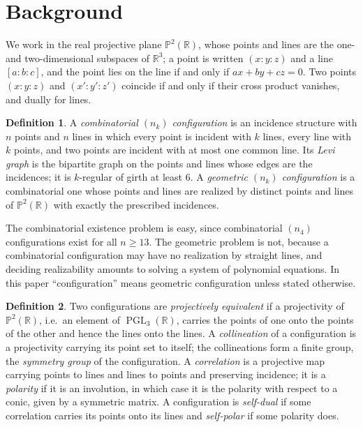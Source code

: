 \documentclass[11pt]{article}
\theoremstyle{plain}
\theoremstyle{definition}
\newtheorem*{definition}{Definition}
\newcommand{\RR}{\mathbb{R}}
\newcommand{\PP}{\mathbb{P}}
\newcommand{\PGL}{\operatorname{PGL}}
\begin{document}
\section{Background}\label{sec:background}

We work in the real projective plane $\PP^2(\RR)$, whose points and lines are the one- and two-dimensional subspaces of $\RR^3$; a point is written $(x{:}y{:}z)$ and a line $[a{:}b{:}c]$, and the point lies on the line if and only if $ax+by+cz=0$.  Two points $(x{:}y{:}z)$ and $(x'{:}y'{:}z')$ coincide if and only if their cross product vanishes, and dually for lines.

\begin{definition}
A \emph{combinatorial $(n_k)$ configuration} is an incidence structure with $n$ points and $n$ lines in which every point is incident with $k$ lines, every line with $k$ points, and two points are incident with at most one common line.  Its \emph{Levi graph} is the bipartite graph on the points and lines whose edges are the incidences; it is $k$-regular of girth at least $6$.  A \emph{geometric $(n_k)$ configuration} is a combinatorial one whose points and lines are realized by distinct points and lines of $\PP^2(\RR)$ with exactly the prescribed incidences.
\end{definition}

The combinatorial existence problem is easy, since combinatorial $(n_4)$ configurations exist for all $n\ge13$.  The geometric problem is not, because a combinatorial configuration may have no realization by straight lines, and deciding realizability amounts to solving a system of polynomial equations.  In this paper ``configuration'' means geometric configuration unless stated otherwise.

\begin{definition}
Two configurations are \emph{projectively equivalent} if a projectivity of $\PP^2(\RR)$, i.e.\ an element of $\PGL_3(\RR)$, carries the points of one onto the points of the other and hence the lines onto the lines.  A \emph{collineation} of a configuration is a projectivity carrying its point set to itself; the collineations form a finite group, the \emph{symmetry group} of the configuration.  A \emph{correlation} is a projective map carrying points to lines and lines to points and preserving incidence; it is a \emph{polarity} if it is an involution, in which case it is the polarity with respect to a conic, given by a symmetric matrix.  A configuration is \emph{self-dual} if some correlation carries its points onto its lines and \emph{self-polar} if some polarity does.
\end{definition}
\end{document}
